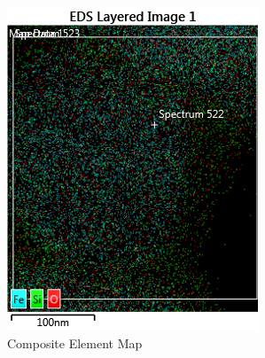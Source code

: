 \documentclass[12pt,a4paper]{article}
\begin{document}
\begin{figure}[htbp]
  \centering
  \begin{subfigure}[b]{0.35\textwidth}
    \includegraphics[width=\textwidth]{Data/Map.png}
    \caption{Composite Element Map}
    \label{fig:map}
  \end{subfigure}
  \begin{subfigure}[b]{0.35\textwidth}

\end{subfigure}
\end{figure}
\end{document}
